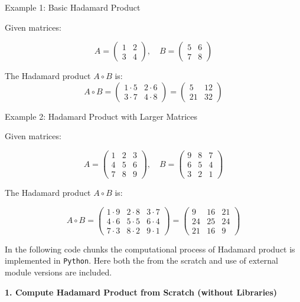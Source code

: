 \documentclass[
  letterpaper,
  DIV=11,
  numbers=noendperiod]{scrreprt}
\theoremstyle{plain}
\theoremstyle{definition}
\theoremstyle{remark}
\begin{document}
Example 1: Basic Hadamard Product

Given matrices:

\[A = \begin{pmatrix}
1 & 2 \\
3 & 4
\end{pmatrix}, \quad
B = \begin{pmatrix}
5 & 6 \\
7 & 8
\end{pmatrix}\]

The Hadamard product \(A \circ B\) is: \[A \circ B = \begin{pmatrix}
1 \cdot 5 & 2 \cdot 6 \\
3 \cdot 7 & 4 \cdot 8
\end{pmatrix} = \begin{pmatrix}
5 & 12 \\
21 & 32
\end{pmatrix}\]

Example 2: Hadamard Product with Larger Matrices

Given matrices:

\[A = \begin{pmatrix}
1 & 2 & 3 \\
4 & 5 & 6 \\
7 & 8 & 9
\end{pmatrix}, \quad
B = \begin{pmatrix}
9 & 8 & 7 \\
6 & 5 & 4 \\
3 & 2 & 1
\end{pmatrix}\]

The Hadamard product \(A \circ B\) is:

\[A \circ B = \begin{pmatrix}
1 \cdot 9 & 2 \cdot 8 & 3 \cdot 7 \\
4 \cdot 6 & 5 \cdot 5 & 6 \cdot 4 \\
7 \cdot 3 & 8 \cdot 2 & 9 \cdot 1
\end{pmatrix} = \begin{pmatrix}
9 & 16 & 21 \\
24 & 25 & 24 \\
21 & 16 & 9
\end{pmatrix}\]

In the following code chunks the computational process of Hadamard
product is implemented in \texttt{Python}. Here both the from the
scratch and use of external module versions are included.

\textbf{1. Compute Hadamard Product from Scratch (without Libraries)}
\end{document}
